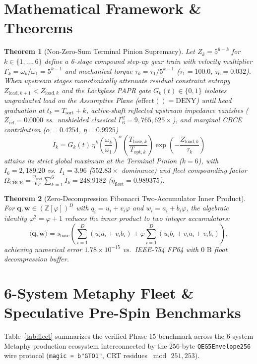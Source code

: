 \documentclass[10pt,twocolumn]{article}
\newtheorem{theorem}{Theorem}
\begin{document}
\section{Mathematical Framework \& Theorems}

\begin{theorem}[Non-Zero-Sum Terminal Pinion Supremacy]
Let $Z_k = 5^{6-k}$ for $k \in \{1,\dots,6\}$ define a 6-stage compound step-up gear train with velocity multiplier $\Gamma_k = \omega_k/\omega_1 = 5^{k-1}$ and mechanical torque $\tau_k = \tau_1 / 5^{k-1}$ ($\tau_1 = 100.0$, $\tau_6 = 0.032$). When upstream stages monotonically attenuate residual constraint entropy $Z_{\text{load},k+1} < Z_{\text{load},k}$ and the Lockglass PAPR gate $G_k(t) \in \{0,1\}$ isolates ungraduated load on the Assumptive Plane ($\text{effect}() = \text{DENY}$) until head graduation at $t_k = T_{\text{sort}} + k$, active-shaft reflected upstream impedance vanishes ($Z_{\text{ref}} = 0.0000$ vs.\ unshielded classical $\Gamma_6^2 = 9{,}765{,}625\times$), and marginal CBCE contribution ($\alpha = 0.4254$, $\eta = 0.9925$)
\begin{equation}
I_k = G_k(t)\,\eta^k\left(\frac{\omega_k}{\omega_1}\right)^\alpha \left(\frac{T_{\text{base},k}}{T_{\text{opt},k}}\right)\exp\!\left(-\frac{Z_{\text{load},k}}{\tau_k}\right)
\end{equation}
attains its strict global maximum at the Terminal Pinion ($k=6$), with $I_6 = 2{,}189.20$ vs.\ $I_1 = 3.96$ ($552.83\times$ dominance) and fleet compounding factor $\Omega_{\text{CBCE}} = \frac{\eta_{\text{fleet}}}{6\varphi}\sum_{k=1}^6 I_k = 248.9182$ ($\eta_{\text{fleet}} = 0.989375$).
\end{theorem}

\begin{theorem}[Zero-Decompression Fibonacci Two-Accumulator Inner Product]
For $\mathbf{q}, \mathbf{w} \in (\mathbb{Z}[\varphi])^D$ with $q_i = u_i + v_i\varphi$ and $w_i = a_i + b_i\varphi$, the algebraic identity $\varphi^2 = \varphi + 1$ reduces the inner product to two integer accumulators:
\begin{equation}
\langle \mathbf{q}, \mathbf{w}\rangle = s_{\text{base}}\!\left(\sum_{i=1}^D (u_i a_i + v_i b_i) + \varphi \sum_{i=1}^D (u_i b_i + v_i a_i + v_i b_i)\right),
\end{equation}
achieving numerical error $1.78 \times 10^{-15}$ vs.\ IEEE-754 FP64 with $0\text{ B}$ float decompression buffer.
\end{theorem}

\section{6-System Metaphy Fleet & Speculative Pre-Spin Benchmarks}
Table~\ref{tab:fleet} summarizes the verified Phase 15 benchmark across the 6-system Metaphy production ecosystem interconnected by the 256-byte \texttt{QEG5Envelope256} wire protocol (\texttt{magic = b"GTO1"}, CRT residues $\bmod\, 251, 253$).
\end{document}
